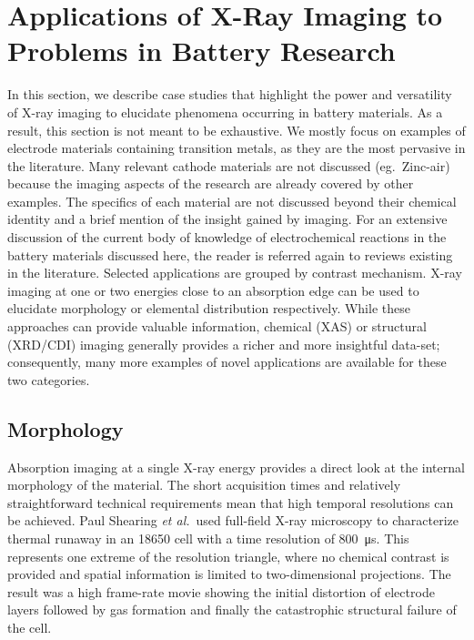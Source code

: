 \documentclass[journal=cmatex,manuscript=perspective]{achemso}
\begin{document}
\section{Applications of X-Ray Imaging to Problems in Battery Research}

In this section, we describe case studies that highlight the power and
versatility of X-ray imaging to elucidate phenomena occurring in
battery materials. As a result, this section is not meant to be
exhaustive. We mostly focus on examples of electrode materials
containing transition metals, as they are the most pervasive in the
literature. Many relevant cathode materials are not discussed
(eg.\ Zinc-air) because the imaging aspects of the research are already
covered by other examples. The specifics of each material are not
discussed beyond their chemical identity and a brief mention of the
insight gained by imaging. For an extensive discussion of the current
body of knowledge of electrochemical reactions in the battery
materials discussed here, the reader is referred again to reviews
existing in the literature\cite{whittingham2014,
  balogun2016}. Selected applications are grouped by contrast
mechanism. X-ray imaging at one or two energies close to an
absorption edge can be used to elucidate morphology or elemental
distribution respectively. While these approaches can provide valuable
information, chemical (XAS) or structural (XRD/CDI) imaging generally
provides a richer and more insightful data-set; consequently, many more
examples of novel applications are available for these two categories.

\subsection{Morphology}

Absorption imaging at a single X-ray energy provides a direct look at
the internal morphology of the material. The short acquisition times
and relatively straightforward technical requirements mean that high
temporal resolutions can be achieved. Paul Shearing \emph{et
  al.}\ used full-field X-ray microscopy to characterize thermal
runaway in an 18650 cell with a time resolution of
\SI{800}{\micro\second}\cite{shearing2015}. This represents one
extreme of the resolution triangle, where no chemical contrast is
provided and spatial information is limited to two-dimensional
projections. The result was a high frame-rate movie showing the
initial distortion of electrode layers followed by gas formation and
finally the catastrophic structural failure of the cell.
\end{document}
